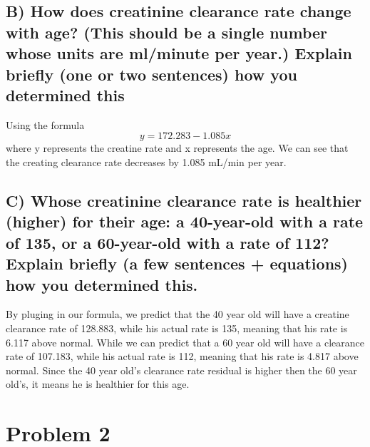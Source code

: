 \documentclass[
]{article}
\begin{document}
\hypertarget{b-how-does-creatinine-clearance-rate-change-with-age-this-should-be-a-single-number-whose-units-are-mlminute-per-year.-explain-briefly-one-or-two-sentences-how-you-determined-this}{%
\subsection{B) How does creatinine clearance rate change with age? (This
should be a single number whose units are ml/minute per year.) Explain
briefly (one or two sentences) how you determined
this}\label{b-how-does-creatinine-clearance-rate-change-with-age-this-should-be-a-single-number-whose-units-are-mlminute-per-year.-explain-briefly-one-or-two-sentences-how-you-determined-this}}

Using the formula \[ y = 172.283 - 1.085x \] where y represents the
creatine rate and x represents the age. We can see that the creating
clearance rate decreases by 1.085 mL/min per year.

\hypertarget{c-whose-creatinine-clearance-rate-is-healthier-higher-for-their-age-a-40-year-old-with-a-rate-of-135-or-a-60-year-old-with-a-rate-of-112-explain-briefly-a-few-sentences-equations-how-you-determined-this.}{%
\subsection{C) Whose creatinine clearance rate is healthier (higher) for
their age: a 40-year-old with a rate of 135, or a 60-year-old with a
rate of 112? Explain briefly (a few sentences + equations) how you
determined
this.}\label{c-whose-creatinine-clearance-rate-is-healthier-higher-for-their-age-a-40-year-old-with-a-rate-of-135-or-a-60-year-old-with-a-rate-of-112-explain-briefly-a-few-sentences-equations-how-you-determined-this.}}

By pluging in our formula, we predict that the 40 year old will have a
creatine clearance rate of 128.883, while his actual rate is 135,
meaning that his rate is 6.117 above normal. While we can predict that a
60 year old will have a clearance rate of 107.183, while his actual rate
is 112, meaning that his rate is 4.817 above normal. Since the 40 year
old's clearance rate residual is higher then the 60 year old's, it means
he is healthier for this age.

\hypertarget{problem-2}{%
\section{Problem 2}\label{problem-2}}
\end{document}
